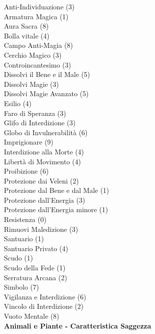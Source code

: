 \begin{multicols}{3}
{	
	Anti-Individuazione (3)\\
	Armatura Magica (1)\\
	Aura Sacra (8)\\
	Bolla vitale (4)\\
	Campo Anti-Magia (8)\\
	Cerchio Magico (3)\\
	Controincantesimo (3)\\
	Dissolvi il Bene e il Male (5)\\
	Dissolvi Magie (3)\\
	Dissolvi Magie Avanzato (5)\\
	Esilio (4)\\
	Faro di Speranza (3)\\
	Glifo di Interdizione (3)\\
	Globo di Invulnerabilità (6)\\
	Imprigionare (9)\\
	Interdizione alla Morte (4)\\
	Libertà di Movimento (4)\\
	Proibizione (6)\\
	Protezione dai Veleni (2)\\
	Protezione dal Bene e dal Male (1)\\
	Protezione dall'Energia (3)\\
	Protezione dall'Energia minore (1)\\
	Resistenza (0)\\
	Rimuovi Maledizione (3)\\
	Santuario (1)\\
	Santuario Privato (4)\\
	Scudo (1)\\
	Scudo della Fede (1)\\
	Serratura Arcana (2)\\
	Simbolo (7)\\
	Vigilanza e Interdizione (6)\\
	Vincolo di Interdizione (2)\\
	Vuoto Mentale (8)\\

	\medskip\textbf{Animali e Piante - Caratteristica Saggezza}

}
\end{multicols}

